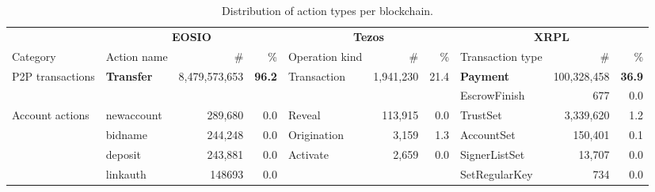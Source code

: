 \begin{table}[htbp]
	\centering
	\caption{Distribution of action types per blockchain.}
	\label{tab:transaction-types-distribution}%
	\setlength{\tabcolsep}{1.4pt}
	\scriptsize
	\begin{tabular}{@{}lp{0.7in}rrp{1.2in}rrp{0.9in}rr@{}}
		\toprule
		                 & \multicolumn{3}{c}{\textbf{EOSIO}} & \multicolumn{3}{c}{\textbf{Tezos}} & \multicolumn{3}{c}{\textbf{ XRPL }}                                                                                                                     \\
		Category         & Action name                        & \#                                 & \%                                  & Operation kind         & \#        & \%                 & Transaction type     & \#          & \%                 \\
		\cmidrule(r){1-1} \cmidrule(rl){2-4} \cmidrule(rl){5-7} \cmidrule(l){8-10}
		P2P transactions & \textbf{Transfer}                  & 8,479,573,653                      & \textbf{             96.2 }         & Transaction            & 1,941,230 & 21.4               & \textbf{Payment}     & 100,328,458 & \textbf{     36.9} \\
		                 &                                    &                                    &                                     &                        &           &                    & EscrowFinish         & 677         & 0.0                \\
		\cmidrule(r){1-1} \cmidrule(rl){2-4} \cmidrule(rl){5-7} \cmidrule(l){8-10}
		Account actions  & newaccount                         & 289,680                            & 0.0                                 & Reveal                 & 113,915   & 0.0                & TrustSet             & 3,339,620   & 1.2                \\
		                 & bidname                            & 244,248                            & 0.0                                 & Origination            & 3,159     & 1.3                & AccountSet           & 150,401     & 0.1                \\
		                 & deposit                            & 243,881                            & 0.0                                 & Activate               & 2,659     & 0.0                & SignerListSet        & 13,707      & 0.0                \\
		                 & linkauth                           & 148693                             & 0.0                                 &                        &           &                    & SetRegularKey        & 734         & 0.0                \\

\end{tabular}
\end{table}
